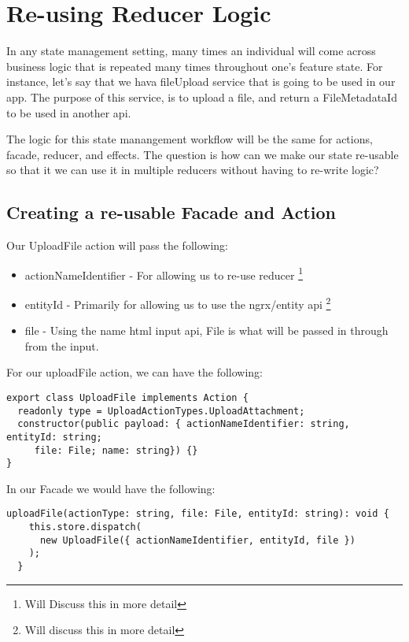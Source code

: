 \maketitle{}
\section{ Re-using Reducer Logic }

In any state management setting, many times an individual will come across
business logic that is repeated many times throughout one's feature state. For
instance, let's say that we hava fileUpload service that is going to be used in
our app. The purpose of this service, is to upload a file, and return a
FileMetadataId to be used in another api.

The logic for this state manangement workflow will be the same for actions,
facade, reducer, and effects. The question is how can we make our state
re-usable so that it we can use it in multiple reducers without having to
re-write logic?

\subsection{Creating a re-usable Facade and Action}
Our UploadFile action will pass the following:
\begin{itemize}
  \item actionNameIdentifier - For allowing us to re-use reducer
  \footnote{Will Discuss this in more detail}
  \item entityId - Primarily for allowing us to use the ngrx/entity api
  \footnote{Will discuss this in more detail}
  \item file - Using the name html input api, File is what will be passed in
  through from the input.
\end{itemize}
For our uploadFile action, we can have the following:
\begin{lstlisting}
export class UploadFile implements Action {
  readonly type = UploadActionTypes.UploadAttachment;
  constructor(public payload: { actionNameIdentifier: string, entityId: string;
     file: File; name: string}) {}
}
\end{lstlisting}

In our Facade we would have the following:

\begin{lstlisting}
uploadFile(actionType: string, file: File, entityId: string): void {
    this.store.dispatch(
      new UploadFile({ actionNameIdentifier, entityId, file })
    );
  }
\end{lstlisting}

